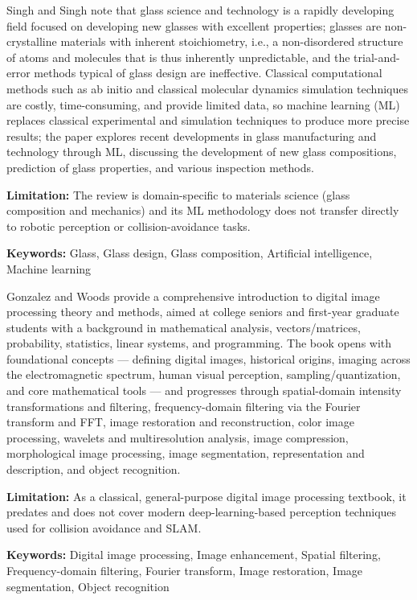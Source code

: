 {
	Singh and Singh \cite{Singh:2022} note that glass science and technology is a rapidly developing field focused on developing new glasses with excellent properties; glasses are non-crystalline materials with inherent stoichiometry, i.e., a non-disordered structure of atoms and molecules that is thus inherently unpredictable, and the trial-and-error methods typical of glass design are ineffective. Classical computational methods such as ab initio and classical molecular dynamics simulation techniques are costly, time-consuming, and provide limited data, so machine learning (ML) replaces classical experimental and simulation techniques to produce more precise results; the paper explores recent developments in glass manufacturing and technology through ML, discussing the development of new glass compositions, prediction of glass properties, and various inspection methods.
	
	\bigskip
	\textbf{Limitation:} The review is domain-specific to materials science (glass composition and mechanics) and its ML methodology does not transfer directly to robotic perception or collision-avoidance tasks.
	
	\scriptsize{\textbf{Keywords:} Glass, Glass design, Glass composition, Artificial intelligence, Machine learning}
}


{
	Gonzalez and Woods \cite{Gonzalez:2008} provide a comprehensive introduction to digital image processing theory and methods, aimed at college seniors and first-year graduate students with a background in mathematical analysis, vectors/matrices, probability, statistics, linear systems, and programming. The book opens with foundational concepts — defining digital images, historical origins, imaging across the electromagnetic spectrum, human visual perception, sampling/quantization, and core mathematical tools — and progresses through spatial-domain intensity transformations and filtering, frequency-domain filtering via the Fourier transform and FFT, image restoration and reconstruction, color image processing, wavelets and multiresolution analysis, image compression, morphological image processing, image segmentation, representation and description, and object recognition.
	
	\bigskip
	\textbf{Limitation:} As a classical, general-purpose digital image processing textbook, it predates and does not cover modern deep-learning-based perception techniques used for collision avoidance and SLAM.
	
	\scriptsize{\textbf{Keywords:} Digital image processing, Image enhancement, Spatial filtering, Frequency-domain filtering, Fourier transform, Image restoration, Image segmentation, Object recognition}
}

